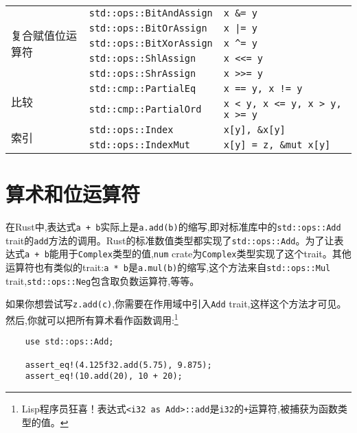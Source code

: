 \begin{table}[htbp]
\begin{tabular}{lll}
        \multirow{5}{*}{复合赋值位运算符} & \texttt{std::ops::BitAndAssign} \cellcolor{tablecolor} & \texttt{x \&= y} \cellcolor{tablecolor} \\
        & \texttt{std::ops::BitOrAssign}& \texttt{x |= y} \\
        & \texttt{std::ops::BitXorAssign} \cellcolor{tablecolor} & \texttt{x \^{}= y} \cellcolor{tablecolor} \\
        & \texttt{std::ops::ShlAssign}  & \texttt{x <<= y} \\
        & \texttt{std::ops::ShrAssign}    \cellcolor{tablecolor} & \texttt{x >>= y}   \cellcolor{tablecolor} \\
        \hline

        \multirow{2}{*}{比较}   & \texttt{std::cmp::PartialEq}  & \texttt{x == y, x != y}   \\
        & \texttt{std::cmp::PartialOrd} \cellcolor{tablecolor} & \texttt{x < y, x <= y, x > y, x >= y} \cellcolor{tablecolor} \\
        \hline

        \multirow{2}{*}{索引}   & \texttt{std::ops::Index}  & \texttt{x[y], \&x[y]} \\
        & \texttt{std::ops::IndexMut} \cellcolor{tablecolor} & \texttt{x[y] = z, \&mut x[y]} \cellcolor{tablecolor} \\
    \end{tabular}
\end{table}

\section{算术和位运算符}

在Rust中,表达式\texttt{a + b}实际上是\texttt{a.add(b)}的缩写,即对标准库中的\texttt{std::ops::Add} trait的\texttt{add}方法的调用。Rust的标准数值类型都实现了\texttt{std::ops::Add}。为了让表达式\texttt{a + b}能用于\texttt{Complex}类型的值,\texttt{num} crate为\texttt{Complex}类型实现了这个trait。其他运算符也有类似的trait:\texttt{a * b}是\texttt{a.mul(b)}的缩写,这个方法来自\texttt{std::ops::Mul} trait,\texttt{std::ops::Neg}包含取负数运算符,等等。

如果你想尝试写\texttt{z.add(c)},你需要在作用域中引入\texttt{Add} trait,这样这个方法才可见。然后,你就可以把所有算术看作函数调用:\footnote{Lisp程序员狂喜！表达式\texttt{<i32 as Add>::add}是\texttt{i32}的\texttt{+}运算符,被捕获为函数类型的值。}

\begin{verbatim}
    use std::ops::Add;

    assert_eq!(4.125f32.add(5.75), 9.875);
    assert_eq!(10.add(20), 10 + 20);
\end{verbatim}

